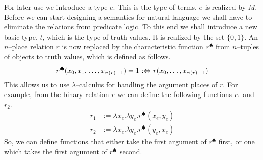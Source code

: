 For later use we introduce a type $e$.  This is the type of 
terms. $e$ is realized by $M$. Before we can start designing 
a semantics for natural language we shall have to eliminate 
the relations from predicate logic.  To this end we shall 
introduce a new basic type, $t$, which is the type of truth 
values. It is realized by the set $\{0,1\}$.  An $n$--place 
relation $r$ is now replaced by the characteristic function 
$r^{\spadesuit}$ from $n$--tuples of objects to truth values, 
which is defined as follows.
\begin{equation}
r^{\spadesuit}(x_0, x_1, \dotsc, x_{\Xi(r)-1}) = 1
\text{ $:\Leftrightarrow$ } r(x_0, \dotsc, x_{\Xi(r)-1})
\end{equation}
This allows us to use $\lambda$--calculus for handling
the argument places of $r$. For example, from the binary relation
$r$ we can define the following functions $r_1$ and $r_2$.
\begin{align}
r_1 & := \lambda x_e. \lambda y_e. r^{\spadesuit}(x_e, y_e) \\
r_2 & := \lambda x_e. \lambda y_e. r^{\spadesuit}(y_e, x_e)
\end{align}
So, we can define functions that either take the first argument
of $r^{\spadesuit}$ first, or one which takes the first argument
of $r^{\spadesuit}$ second.

